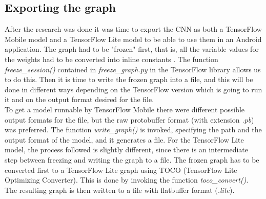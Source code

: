 \subsection{Exporting the graph}
After the research was done it was time to export the CNN as both a TensorFlow Mobile model and a TensorFlow Lite model to be able to use them in an Android application. The graph had to be "frozen" first, that is, all the variable values for the weights had to be converted into inline constants \cite{TFdeploy}. The function \textit{freeze\_session()} contained in \textit{freeze\_graph.py} in the TensorFlow library allows us to do this. Then it is time to write the frozen graph into a file, and this will be done in different ways depending on the TensorFlow version which is going to run it and on the output format desired for the file. \\

To get a model runnable by TensorFlow Mobile there were different possible output formats for the file, but the raw protobuffer format (with extension \textit{.pb}) was preferred. The function \textit{write\_graph()} is invoked, specifying the path and the output format of the model, and it generates a file. For the TensorFlow Lite model, the process followed is slightly different, since there is an intermediate step between freezing and writing the graph to a file. The frozen graph has to be converted first to a TensorFlow Lite graph using TOCO (TensorFlow Lite Optimizing Converter). This is done by invoking the function \textit{toco\_convert()}. The resulting graph is then written to a file with flatbuffer format (\textit{.lite}). \\

